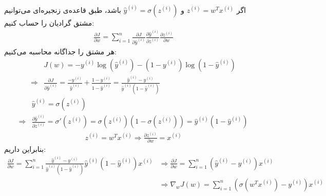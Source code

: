 \begin{ابجد}
\item اگر $z^{(i)} = w^Tx^{(i)}$ و $\hat{y}^{(i)} = \sigma (z^{(i)})$ باشد، طبق قاعده‌ی زنجیره‌ای می‌توانیم مشتق گرادیان را حساب کنیم:
\begin{align*}
    \frac{\partial J}{\partial w} = \sum_{i=1}^{n} \frac{\partial J}{\partial \hat{y}^{(i)}} \frac{\partial \hat{y}^{(i)}}{\partial {z}^{(i)}} \frac{\partial {z}^{(i)}}{\partial w}
\end{align*}
هر مشتق را جداگانه محاسبه می‌کنیم:
\begin{align*}
                & J(w) = -y^{(i)}\log(\hat{y}^{(i)}) - (1 - y^{(i)})\log(1 - \hat{y}^{(i)})                                                                                                               \\
    \Rightarrow & \frac{\partial J}{\partial \hat{y}^{(i)}} = \frac{-{y}^{(i)}}{\hat{y}^{(i)}} + \frac{1-{y}^{(i)}}{1-\hat{y}^{(i)}} = \frac{\hat{y}^{(i)} - {y}^{(i)}}{\hat{y}^{(i)}(1 - \hat{y}^{(i)})}
\end{align*}
\begin{align*}
                & \hat{y}^{(i)} = \sigma (z^{(i)})                                                                                                                    \\
    \Rightarrow & \frac{\partial \hat{y}^{(i)}}{\partial {z}^{(i)}} = \sigma' (z^{(i)}) = \sigma (z^{(i)}) (1 - \sigma (z^{(i)})) = \hat{y}^{(i)} (1 - \hat{y}^{(i)})
\end{align*}
\begin{align*}
    z^{(i)} = w^Tx^{(i)} \Rightarrow \frac{\partial {z}^{(i)}}{\partial w} = x^{(i)}
\end{align*}
بنابراین داریم:
\begin{align*}
    \frac{\partial J}{\partial w} = \sum_{i=1}^{n} \frac{\hat{y}^{(i)} - {y}^{(i)}}{\hat{y}^{(i)}(1 - \hat{y}^{(i)})} \hat{y}^{(i)} (1 - \hat{y}^{(i)}) x^{(i)} & \Rightarrow \frac{\partial J}{\partial w} = \sum_{i=1}^{n} (\hat{y}^{(i)} - {y}^{(i)}) x^{(i)} \\
                                                                                                                                                                & \Rightarrow \nabla_w J(w) = \sum_{i=1}^{n} (\sigma(w^Tx^{(i)}) - {y}^{(i)}) x^{(i)}
\end{align*}


\end{ابجد}
